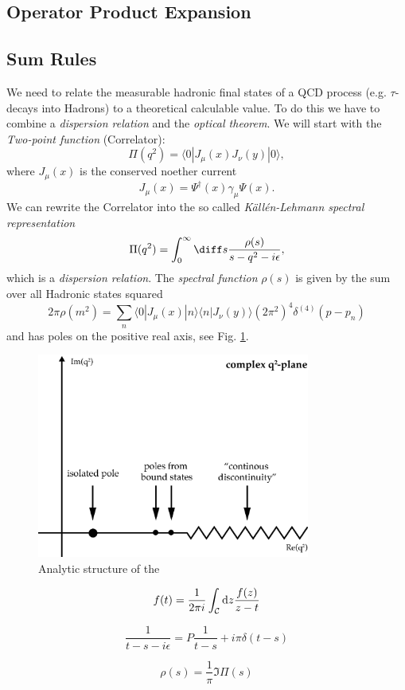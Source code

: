 \documentclass[../../index.tex]{subfiles}
\begin{document}
\subsection{Operator Product Expansion}

\subsection{Sum Rules}
We need to relate the measurable hadronic final states of a QCD process (e.g.
$\tau$-decays into Hadrons) to a theoretical calculable value. To do this we
have to combine a \textit{dispersion relation} and the \textit{optical theorem}.
We will start with the \textit{Two-point function} (Correlator):
\begin{equation}
  \label{eq:twoPointFunction}
  \Pi(q^2) = \langle  0 | J_\mu(x) J_\nu(y) | 0 \rangle,
\end{equation}
where $J_\mu(x)$ is the conserved noether current
\begin{equation}
  J_\mu(x) = \Psi^\dagger(x)\gamma_\mu\Psi(x).
\end{equation}
We can rewrite the Correlator into the so called \textit{Källén-Lehmann spectral representation}
\cite{Kallen1952}\cite{Lehmann1954}
\begin{equation}
  \Pi(q^2) = \int_0^\infty \diff s \frac{\rho(s)}{s - q^2 - i \epsilon},
\end{equation}
which is a \textit{dispersion relation}. The \textit{spectral function} $\rho(s)$ is given by the sum over all Hadronic
states squared 
\begin{equation}
  2 \pi \rho(m^2) = \sum_n \langle  0 | J_\mu(x) | n \rangle \langle n | J_\nu(y) \rangle (2 \pi^2)^4 \delta^{(4)}(p - p_n)
\end{equation}
and has poles on the positive real axis, see Fig. \ref{fig:analyticStructureCorrelator}. 
\begin{figure}[h]
  \centering
  \label{fig:analyticStructureCorrelator}
  \includegraphics[width=0.8\textwidth]{./images/analyticStructureCorrelator.eps}
  \caption{Analytic structure of the \cite{Peskin1995}}
\end{figure}

\begin{equation}
  f(t) = \frac{1}{2 \pi i} \int_{\mathcal{C}} \dif z \frac{f(z)}{z - t}
\end{equation}

\begin{equation}
  \frac{1}{t - s - i\epsilon} = P \frac{1}{t - s} + i \pi \delta(t - s)
\end{equation}

\begin{equation}
  \rho(s) = \frac{1}{\pi} \Im \Pi(s)
\end{equation}
\end{document}

